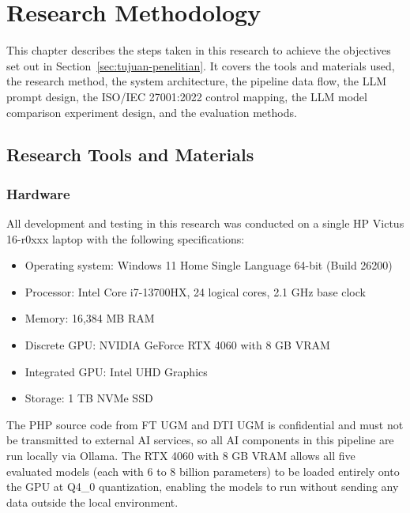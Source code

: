 
\chapter{Research Methodology}

This chapter describes the steps taken in this research to achieve the objectives set out in Section~\ref{sec:tujuan-penelitian}. It covers the tools and materials used, the research method, the system architecture, the pipeline data flow, the LLM prompt design, the ISO/IEC 27001:2022 control mapping, the LLM model comparison experiment design, and the evaluation methods.

\section{Research Tools and Materials}

\subsection{Hardware}

All development and testing in this research was conducted on a single HP Victus 16-r0xxx laptop with the following specifications:

\begin{itemize}

    \item Operating system: Windows 11 Home Single Language 64-bit (Build 26200)

    \item Processor: Intel Core i7-13700HX, 24 logical cores, 2.1 GHz base clock

    \item Memory: 16,384 MB RAM

    \item Discrete GPU: NVIDIA GeForce RTX 4060 with 8 GB VRAM

    \item Integrated GPU: Intel UHD Graphics

    \item Storage: 1 TB NVMe SSD

\end{itemize}

The PHP source code from FT UGM and DTI UGM is confidential and must not be transmitted to external AI services, so all AI components in this pipeline are run locally via Ollama. The RTX 4060 with 8 GB VRAM allows all five evaluated models (each with 6 to 8 billion parameters) to be loaded entirely onto the GPU at Q4\_0 quantization, enabling the models to run without sending any data outside the local environment.

